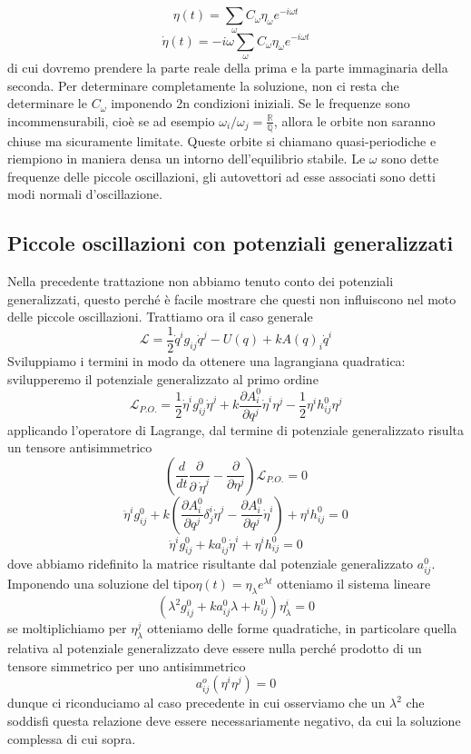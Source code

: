 \documentclass[
10pt, %
a4paper, %
oneside, %
headinclude,footinclude, %
BCOR5mm, %
]{scrartcl}
\begin{document}
\[\eta (t) = \sum_\omega C_{\omega} \eta_{\omega}e^{-i\omega t} \]
\[\dot{\eta}(t) = -i\omega\sum_\omega C_{\omega} \eta_{\omega}e^{-i\omega t}\]
di cui dovremo prendere la parte reale della prima e la parte immaginaria della seconda. Per determinare completamente la soluzione, non ci resta che determinare le \(C_{\omega}\) imponendo 2n condizioni iniziali. Se le frequenze sono incommensurabili, cioè se ad esempio
\(\omega_i/\omega_j = \frac{\mathbb{R}}{\mathbb{Q}}\), allora le orbite non saranno chiuse ma sicuramente limitate. Queste orbite si chiamano quasi-periodiche e riempiono in maniera densa un intorno dell'equilibrio stabile. Le \(\omega\) sono dette frequenze delle piccole oscillazioni, gli autovettori ad esse associati sono detti modi normali d'oscillazione. 
\subsection{Piccole oscillazioni con potenziali generalizzati}
Nella precedente trattazione non abbiamo tenuto conto dei potenziali generalizzati, questo perché è facile mostrare che questi non influiscono nel moto delle piccole oscillazioni. Trattiamo ora il caso generale
\[\mathcal{L} = \frac{1}{2}\dot{q}^ig_{ij}\dot{q}^j-U(q)+kA(q)_i\dot{q}^i\]
Sviluppiamo i termini in modo da ottenere una lagrangiana quadratica: svilupperemo il potenziale generalizzato al primo ordine
\[\mathcal{L}_{P.O.} = \frac{1}{2}\dot{\eta}^ig^0_{ij}\dot{\eta}^j+k\frac{\partial A^0_i}{\partial q^j}\dot{\eta}^i\eta^j-\frac{1}{2}\eta^ih^0_{ij}\eta^j\]
applicando l'operatore di Lagrange, dal termine di potenziale generalizzato risulta un tensore antisimmetrico
\[\left(\frac{d}{dt}\frac{\partial}{\partial\ \dot{\eta}^j}-\frac{\partial}{\partial \eta^j}\right)\mathcal{L}_{P.O.} = 0 \]
\[\ddot{\eta}^i g^0_{ij}+k\left(\frac{\partial A^0_i}{\partial q^j}\delta^i_j\dot{\eta}^j-\frac{\partial A^0_i}{\partial q^j}\dot{\eta}^i\right)+\eta^ih^0_{ij}=0\]
\[\ddot{\eta}^i g^0_{ij}+ka^0_{ij}\dot{\eta}^i+\eta^ih^0_{ij}=0\]
dove abbiamo ridefinito la matrice risultante dal potenziale generalizzato \(a^0_{ij}\). Imponendo una soluzione del tipo\(\eta(t) = \eta_\lambda e^{\lambda t}\) otteniamo il sistema lineare
\[(\lambda^2 g^0_{ij}+ka^0_{ij}\lambda+h^0_{ij})\eta_\lambda^i=0\]
se moltiplichiamo per \(\eta_\lambda^j\) otteniamo delle forme quadratiche, in particolare quella relativa al potenziale generalizzato deve essere nulla perché prodotto di un tensore simmetrico per uno antisimmetrico
\[a^o_{ij}(\eta^i\eta^j) = 0\]
dunque ci riconduciamo al caso precedente in cui osserviamo che un \(\lambda^2\) che soddisfi questa relazione deve essere necessariamente negativo, da cui la soluzione complessa di cui sopra.
\end{document}
